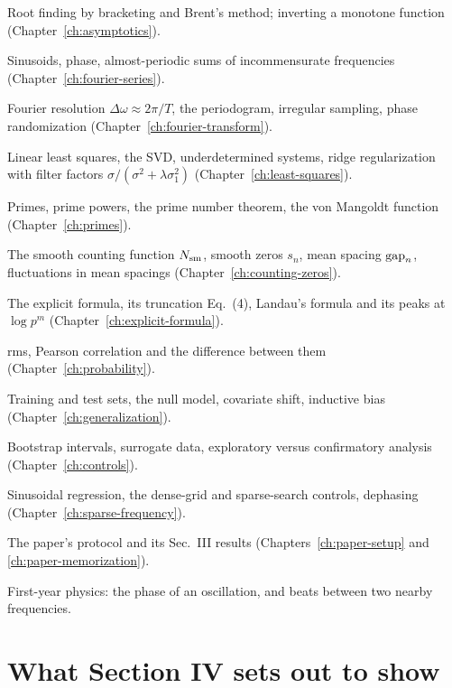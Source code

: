 \begin{prerequisites}
\item Root finding by bracketing and Brent's method; inverting a monotone function (Chapter~\ref{ch:asymptotics}).
\item Sinusoids, phase, almost-periodic sums of incommensurate frequencies (Chapter~\ref{ch:fourier-series}).
\item Fourier resolution $\Delta\omega\approx 2\pi/T$, the periodogram, irregular sampling, phase randomization (Chapter~\ref{ch:fourier-transform}).
\item Linear least squares, the SVD, underdetermined systems, ridge regularization with filter factors $\sigma/(\sigma^2+\lambda\sigma_1^2)$ (Chapter~\ref{ch:least-squares}).
\item Primes, prime powers, the prime number theorem, the von Mangoldt function (Chapter~\ref{ch:primes}).
\item The smooth counting function $N_{\mathrm{sm}}$, smooth zeros $s_n$, mean spacing $\mathrm{gap}_n$, fluctuations in mean spacings (Chapter~\ref{ch:counting-zeros}).
\item The explicit formula, its truncation Eq.~(4), Landau's formula and its peaks at $\log p^m$ (Chapter~\ref{ch:explicit-formula}).
\item rms, Pearson correlation and the difference between them (Chapter~\ref{ch:probability}).
\item Training and test sets, the null model, covariate shift, inductive bias (Chapter~\ref{ch:generalization}).
\item Bootstrap intervals, surrogate data, exploratory versus confirmatory analysis (Chapter~\ref{ch:controls}).
\item Sinusoidal regression, the dense-grid and sparse-search controls, dephasing (Chapter~\ref{ch:sparse-frequency}).
\item The paper's protocol and its Sec.~III results (Chapters~\ref{ch:paper-setup} and \ref{ch:paper-memorization}).
\item First-year physics: the phase of an oscillation, and beats between two nearby frequencies.
\end{prerequisites}

\section{What Section IV sets out to show}\label{sec:paper-arithmetic-aim}

